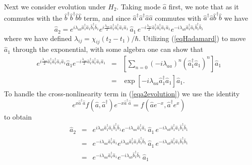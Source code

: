 \documentclass{iopart}
\begin{document}
Next we consider evolution under $H_2$. Taking mode $\hat{a}$ first, we note that as it commutes with the $\hat{b}^{\dagger} \hat{b}^{\dagger} \hat{b} \hat{b}$ term, and since $\hat{a}^{\dagger} \hat{a}^{\dagger} \hat{a} \hat{a}$ commutes with $\hat{a}^{\dagger} \hat{a} \hat{b}^{\dagger} \hat{b}$ we have
\begin{equation}
\hat{a}_2 = e^{i \lambda_{ab} \hat{a}_1^{\dagger} \hat{a}_1 \hat{b}_1^{\dagger} \hat{b}_1 } 
          e^{ i \frac{\lambda_{aa}} {2} \hat{a}_1^{\dagger} \hat{a}_1^{\dagger} \hat{a}_1 \hat{a}_1}\, \hat{a}_1 \,  
          e^{ -i \frac{\lambda_{aa}}{2} \hat{a}_1^{\dagger} \hat {a}_1^{\dagger} \hat{a}_1 \hat{a}_1 }
          e^{-i \lambda_{ab} \hat{a}_1^{\dagger} \hat{a}_1 \hat{b}_1^{\dagger} \hat{b}_1}
\label{eqa2evolution}
\end{equation}
where we have defined $\lambda_{ij} = \chi_{ij} (t_2-t_1)/\hbar$. Utilizing (\ref{eqHadamard}) to move $\hat{a}_1$ through the exponential, with some algebra one can show that
\begin{eqnarray}
e^{ i \frac{\lambda_{aa}} {2} \hat{a}_1^{\dagger} \hat{a}_1^{\dagger} \hat{a}_1 \hat{a}_1} \hat{a}_1 
         e^{ -i \frac{\lambda_{aa}} {2} \hat{a}_1^{\dagger} \hat{a}_1^{\dagger} \hat{a}_1 \hat{a}_1} &=& \left[ \sum_{n=0} (-i \lambda_{aa})^n (\hat{a}_1^{\dagger} \hat{a}_1)^n \right] \hat{a}_1 \nonumber \nonumber \\
   &=& \exp[-i \lambda_{aa} \hat{a}_1^{\dagger} \hat{a}_1] \hat{a}_1.
\end{eqnarray}
To handle the cross-nonlinearity term in (\ref{eqa2evolution}) we use the identity \cite{louisell}
\begin{equation}
e^{x \hat{a}^{\dagger} \hat{a}} f(\hat{a}, \hat{a}^{\dagger}) e^{-x \hat{a}^{\dagger} \hat{a}} = f(\hat{a}e^{-x}, \hat{a}^{\dagger} e^{x})
\label{eqefeidentity}
\end{equation}
to obtain
\begin{eqnarray}
\hat{a}_2 &=& e^{i \lambda_{ab} \hat{a}_1^{\dagger} \hat{a}_1 \hat{b}_1^{\dagger} \hat{b}_1 } 
          e^{-i \lambda_{aa} \hat{a}_1^{\dagger} \hat{a}_1} \, \hat{a}_1 \,
          e^{-i \lambda_{ab} \hat{a}_1^{\dagger} \hat{a}_1 \hat{b}_1^{\dagger} \hat{b}_1} \nonumber \\
%
          &=& e^{-i \lambda_{aa} \hat{a}_1^{\dagger} \hat{a}_1} 
              e^{i \lambda_{ab} \hat{a}_1^{\dagger} \hat{a}_1 \hat{b}_1^{\dagger} \hat{b}_1 } \, \hat{a}_1 \,
          e^{-i \lambda_{ab} \hat{a}_1^{\dagger} \hat{a}_1 \hat{b}_1^{\dagger} \hat{b}_1} \nonumber \\
%
          &=& e^{-i \lambda_{aa} \hat{a}_1^{\dagger} \hat{a}_1} e^{-i \lambda_{ab} \hat{b}_1^{\dagger} \hat{b}_1} \, \hat{a}_1
\label{eqa2}
\end{eqnarray}
\end{document}
